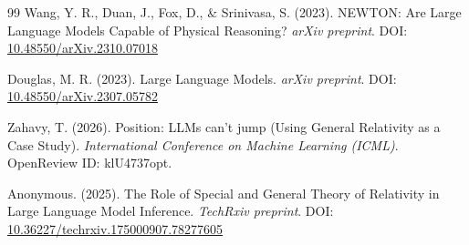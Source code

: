 \documentclass[9pt,a4paper,twocolumn]{article}
\begin{document}
\begin{strip}
\begin{footnotesize}
\begin{thebibliography}{99}
Wang, Y. R., Duan, J., Fox, D., \& Srinivasa, S. (2023). NEWTON: Are Large Language Models Capable of Physical Reasoning? \textit{arXiv preprint}. DOI: \href{https://doi.org}{10.48550/arXiv.2310.07018}

Douglas, M. R. (2023). Large Language Models. \textit{arXiv preprint}. DOI: \href{https://doi.org/10.48550/arXiv.2307.05782}{10.48550/arXiv.2307.05782}

Zahavy, T. (2026). Position: LLMs can't jump (Using General Relativity as a Case Study). \textit{International Conference on Machine Learning (ICML)}. OpenReview ID: klU4737opt. 

Anonymous. (2025). The Role of Special and General Theory of Relativity in Large Language Model Inference. \textit{TechRxiv preprint}. DOI: \href{https://doi.org}{10.36227/techrxiv.175000907.78277605}


\end{thebibliography}
\end{footnotesize}
\end{strip}
\end{document}
